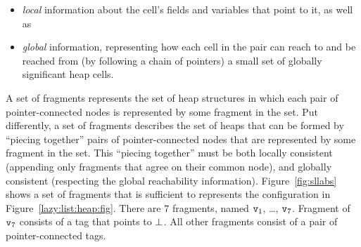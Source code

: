 \begin{itemize}
\item {\em local} information about the cell's fields and variables that
  point to it, as well as
\item {\em global} information, representing how
  each cell in the pair can reach to and be reached from
  (by following a chain of pointers) a small set of globally significant
  heap cells.
\end{itemize}
 A set of fragments represents the set of heap
structures in which each pair of pointer-connected nodes is represented by some
fragment in the set.
Put differently, a set of fragments describes the set of heaps that can be formed by
``piecing together'' pairs of pointer-connected nodes that are represented
by some fragment in the set. This ``piecing together'' must
be both locally consistent (appending only fragments that agree on their
common node), and globally consistent (respecting the global reachability
information).
%
Figure~\ref{fig:sllabs} shows a set of fragments that is sufficient to
represents the configuration in Figure~\ref{lazy:list:heap:fig}. There are $7$ fragments, named $\mathtt{v}_1$, \ldots , $\mathtt{v}_{7}$. Fragment of
$\mathtt{v}_{7}$ consists of a tag that points to $\bot$. All other fragments consist of a pair of pointer-connected tags.


